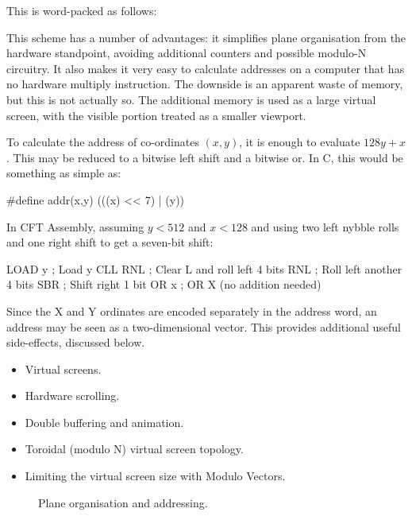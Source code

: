 \noindent This is word-packed as follows:

\noindent This scheme has a number of advantages: it simplifies plane
organisation from the hardware standpoint, avoiding additional counters and
possible modulo-N circuitry. It also makes it very easy to calculate addresses
on a computer that has no hardware multiply instruction. The downside is an
apparent waste of memory, but this is not actually so. The additional memory is
used as a large virtual screen, with the visible portion treated as a smaller
viewport.

To calculate the address of co-ordinates $(x,y)$, it is enough to
evaluate $128y+x$. This may be reduced to a bitwise left shift and a
bitwise or. In C, this would be something as simple as:

\begin{ccode}
#define addr(x,y) (((x) << 7) | (y))
\end{ccode}

In CFT Assembly, assuming $y < 512$ and $x < 128$ and using two left nybble rolls
and one right shift to get a seven-bit shift:

\begin{cftasmcode}
         LOAD y                      ; Load y
         CLL RNL                     ; Clear L and roll left 4 bits
         RNL                         ; Roll left another 4 bits
         SBR                         ; Shift right 1 bit
         OR x                        ; OR X (no addition needed)
\end{cftasmcode}

\noindent Since the X and Y ordinates are encoded separately in the address word, an
address may be seen as a two-dimensional vector. This provides additional
useful side-effects, discussed below.

\begin{itemize}
\item Virtual screens.
\item Hardware scrolling.
\item Double buffering and animation.
\item Toroidal (modulo N) virtual screen topology.
\item Limiting the virtual screen size with Modulo Vectors. 
\end{itemize}

\begin{figure}
 \centering
 \caption[Plane Organisation]{\label{fig:plane-org} Plane organisation and
   addressing.}
\end{figure}



